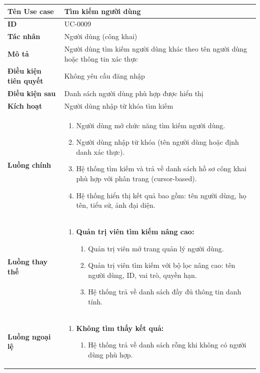 {
\small
\renewcommand{\arraystretch}{1.15}

\begin{tabularx}{\textwidth}{|>{\raggedright\arraybackslash}p{3.5cm}|>{\raggedright\arraybackslash}X|}
\hline
\textbf{Tên Use case} & Tìm kiếm người dùng \\
\hline
\textbf{ID} & UC-0009 \\
\hline
\textbf{Tác nhân} & Người dùng (công khai) \\
\hline
\textbf{Mô tả} & Người dùng tìm kiếm người dùng khác theo tên người dùng hoặc thông tin xác thực \\
\hline
\textbf{Điều kiện tiên quyết} & Không yêu cầu đăng nhập \\
\hline
\textbf{Điều kiện sau} & Danh sách người dùng phù hợp được hiển thị \\
\hline
\textbf{Kích hoạt} & Người dùng nhập từ khóa tìm kiếm \\
\hline
\textbf{Luồng chính} &
\begin{enumerate}
    \item Người dùng mở chức năng tìm kiếm người dùng.
    \item Người dùng nhập từ khóa (tên người dùng hoặc định danh xác thực).
    \item Hệ thống tìm kiếm và trả về danh sách hồ sơ công khai phù hợp với phân trang (cursor-based).
    \item Hệ thống hiển thị kết quả bao gồm: tên người dùng, họ tên, tiểu sử, ảnh đại diện.
\end{enumerate} \\
\hline
\textbf{Luồng thay thế} &
\begin{enumerate}
    \item \textbf{Quản trị viên tìm kiếm nâng cao:}
    \begin{enumerate}
        \item[1A.] Quản trị viên mở trang quản lý người dùng.
        \item[2A.] Quản trị viên tìm kiếm với bộ lọc nâng cao: tên người dùng, ID, vai trò, quyền hạn.
        \item[3A.] Hệ thống trả về danh sách đầy đủ thông tin danh tính.
    \end{enumerate}
\end{enumerate} \\
\hline
\textbf{Luồng ngoại lệ} &
\begin{enumerate}
    \item \textbf{Không tìm thấy kết quả:}
    \begin{enumerate}
        \item[3Err.] Hệ thống trả về danh sách rỗng khi không có người dùng phù hợp.
    \end{enumerate}
\end{enumerate} \\
\hline
\end{tabularx}
}
